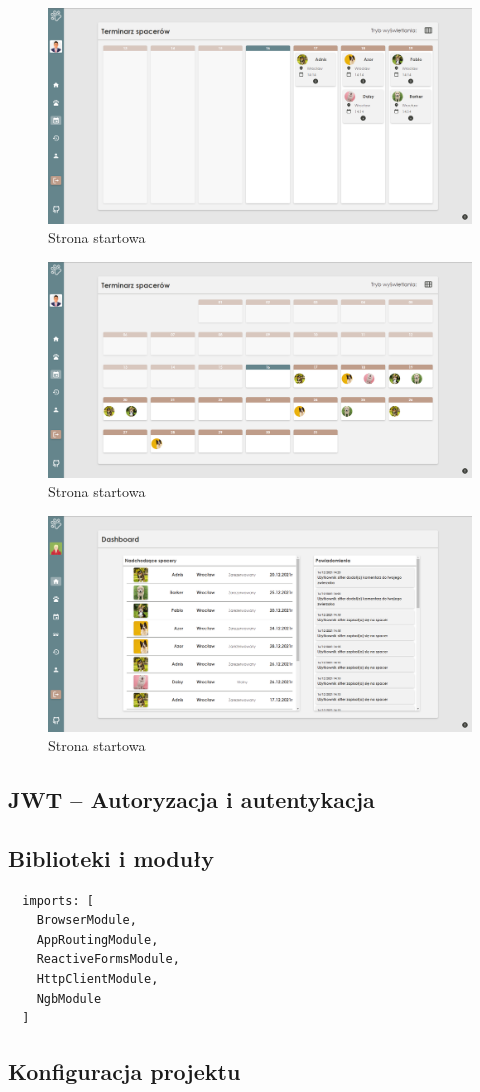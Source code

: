 \begin{figure}[H]
  \centering
  \includegraphics[width=1\linewidth]{rysunki/walker-5.PNG}
  \caption{Strona startowa}
  \label{fig:walker-landing-page}
\end{figure}
\begin{figure}[H]
  \centering
  \includegraphics[width=1\linewidth]{rysunki/walker-7.PNG}
  \caption{Strona startowa}
  \label{fig:walker-landing-page}
\end{figure}
\begin{figure}[H]
  \centering
  \includegraphics[width=1\linewidth]{rysunki/walker-8.PNG}
  \caption{Strona startowa}
  \label{fig:walker-landing-page}
\end{figure}


\subsection{JWT -- Autoryzacja i autentykacja}

\subsection{Biblioteki i moduły}
\begin{lstlisting}
  imports: [
    BrowserModule,
    AppRoutingModule,
    ReactiveFormsModule,
    HttpClientModule,
    NgbModule
  ]
\end{lstlisting}

\subsection{Konfiguracja projektu}
